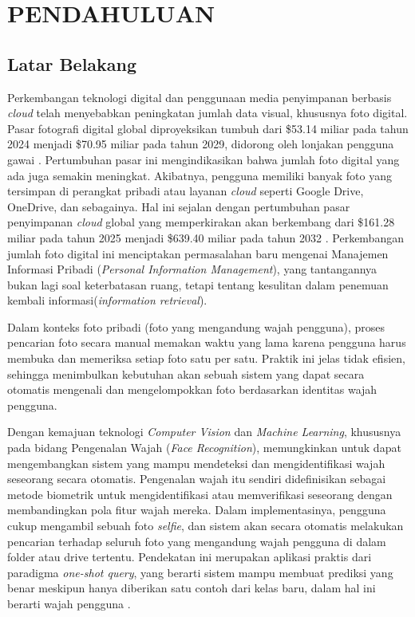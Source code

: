 \cleardoublepage %
\chapter{PENDAHULUAN}
\label{chap:pendahuluan}
\section{Latar Belakang}

Perkembangan teknologi digital dan penggunaan media penyimpanan berbasis \textit{cloud} telah menyebabkan peningkatan jumlah data visual, khususnya foto digital. Pasar fotografi digital global diproyeksikan tumbuh dari \$53.14 miliar pada tahun 2024 menjadi \$70.95 miliar pada tahun 2029, didorong oleh lonjakan pengguna gawai \autocite{TheBusinessResearchCompany2025}. Pertumbuhan pasar ini mengindikasikan bahwa jumlah foto digital yang ada juga semakin meningkat. Akibatnya, pengguna memiliki banyak foto yang tersimpan di perangkat pribadi atau layanan \textit{cloud} seperti Google Drive, OneDrive, dan sebagainya. Hal ini sejalan dengan pertumbuhan pasar penyimpanan \textit{cloud} global yang memperkirakan akan berkembang dari \$161.28 miliar pada tahun 2025 menjadi \$639.40 miliar pada tahun 2032 \autocite{FortuneBusinessInsights2025}. Perkembangan jumlah foto digital ini menciptakan permasalahan baru mengenai Manajemen Informasi Pribadi (\textit{Personal Information Management}), yang tantangannya bukan lagi soal keterbatasan ruang, tetapi tentang kesulitan dalam penemuan kembali informasi(\textit{information retrieval}).

Dalam konteks foto pribadi (foto yang mengandung wajah pengguna), proses pencarian foto secara manual memakan waktu yang lama karena pengguna harus membuka dan memeriksa setiap foto satu per satu. Praktik ini jelas tidak efisien, sehingga menimbulkan kebutuhan akan sebuah sistem yang dapat secara otomatis mengenali dan mengelompokkan foto berdasarkan identitas wajah pengguna.  

Dengan kemajuan teknologi \textit{Computer Vision} dan \textit{Machine Learning}, khususnya pada bidang Pengenalan Wajah (\textit{Face Recognition}), memungkinkan untuk dapat mengembangkan sistem yang mampu mendeteksi dan mengidentifikasi wajah seseorang secara otomatis. Pengenalan wajah itu sendiri didefinisikan sebagai metode biometrik untuk mengidentifikasi atau memverifikasi seseorang dengan membandingkan pola fitur wajah mereka. Dalam implementasinya, pengguna cukup mengambil sebuah foto \textit{selfie}, dan sistem akan secara otomatis melakukan pencarian terhadap seluruh foto yang mengandung wajah pengguna di dalam folder atau drive tertentu. Pendekatan ini merupakan aplikasi praktis dari paradigma \textit{one-shot query}, yang berarti sistem mampu membuat prediksi yang benar meskipun hanya diberikan satu contoh dari kelas baru, dalam hal ini berarti wajah pengguna \autocite{Albayati2024}.


